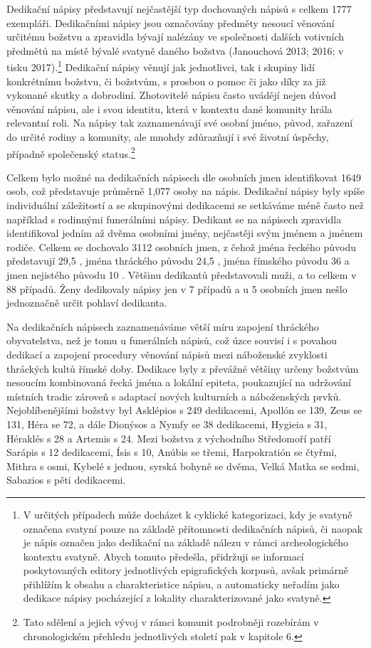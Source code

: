 Dedikační nápisy představují nejčastější typ dochovaných nápisů s celkem 1777 exempláři. Dedikačními nápisy jsou označovány předměty nesoucí věnování určitému božstvu a zpravidla bývají nalézány ve společnosti dalších votivních předmětů na místě bývalé svatyně daného božstva (Janouchová 2013; 2016; v tisku 2017).\footnote{V určitých případech může docházet k cyklické kategorizaci, kdy je svatyně označena svatyní pouze na základě přítomnosti dedikačních nápisů, či naopak je nápis označen jako dedikační na základě nálezu v rámci archeologického kontextu svatyně. Abych tomuto předešla, přidržuji se informací poskytovaných editory jednotlivých epigrafických korpusů, avšak primárně přihlížím k obsahu a charakteristice nápisu, a automaticky neřadím jako dedikace nápisy pocházející z lokality charakterizované jako svatyně.} Dedikační nápisy věnují jak jednotlivci, tak i skupiny lidí konkrétnímu božstvu, či božstvům, s prosbou o pomoc či jako díky za již vykonané skutky a dobrodiní. Zhotovitelé nápisu často uvádějí nejen důvod věnování nápisu, ale i svou identitu, která v kontextu dané komunity hrála relevantní roli. Na nápisy tak zaznamenávají své osobní jméno, původ, zařazení do určité rodiny a komunity, ale mnohdy zdůrazňují i své životní úspěchy, případně společenský status.\footnote{Tato sdělení a jejich vývoj v rámci komunit podrobněji rozebírám v chronologickém přehledu jednotlivých století pak v kapitole 6.}

Celkem bylo možné na dedikačních nápisech dle osobních jmen identifikovat 1649 osob, což představuje průměrně 1,077 osoby na nápis. Dedikační nápisy byly spíše individuální záležitostí a se skupinovými dedikacemi se setkáváme méně často než například s rodinnými funerálními nápisy. Dedikant se na nápisech zpravidla identifikoval jedním až dvěma osobními jmény, nejčastěji svým jménem a jménem rodiče. Celkem se dochovalo 3112 osobních jmen, z čehož jména řeckého původu představují 29,5 , jména thráckého původu 24,5 , jména římského původu 36  a jmen nejistého původu 10 . Většinu dedikantů představovali muži, a to celkem v 88  případů. Ženy dedikovaly nápisy jen v 7  případů a u 5  osobních jmen nešlo jednoznačně určit pohlaví dedikanta.

Na dedikačních nápisech zaznamenáváme větší míru zapojení thráckého obyvatelstva, než je tomu u funerálních nápisů, což úzce souvisí i s povahou dedikací a zapojení procedury věnování nápisů mezi náboženské zvyklosti thráckých kultů římské doby. Dedikace byly z převážné většiny určeny božstvům nesoucím kombinovaná řecká jména a lokální epiteta, poukazující na udržování místních tradic zároveň s adaptací nových kulturních a náboženských prvků. Nejoblíbenějšími božstvy byl Asklépios s 249 dedikacemi, Apollón se 139, Zeus se 131, Héra se 72, a dále Dionýsos a Nymfy se 38 dedikacemi, Hygieia s 31, Héraklés s 28 a Artemis s 24. Mezi božstva z východního Středomoří patří Sarápis s 12 dedikacemi, Ísis s 10, Anúbis se třemi, Harpokratión se čtyřmi, Mithra s osmi, Kybelé s jednou, syrská bohyně se dvěma, Velká Matka se sedmi, Sabazios s pěti dedikacemi.

